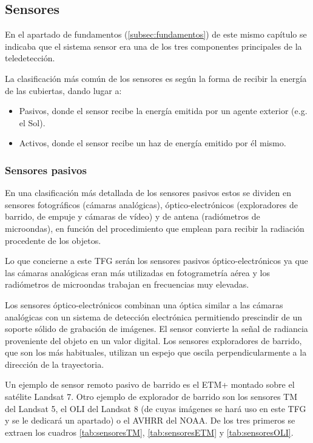 \subsection{Sensores}
\label{subsec:sensores}
En el apartado de fundamentos (\ref{subsec:fundamentos}) de este mismo capítulo se indicaba que el sistema sensor era una de los tres componentes principales de la teledetección.%

La clasificación más común de los sensores es según la forma de recibir la energía de las cubiertas, dando lugar a:
\begin{itemize}
	\item Pasivos, donde el sensor recibe la energía emitida por un agente exterior (e.g. el Sol).
	\item Activos, donde el sensor recibe un haz de energía emitido por él mismo.
\end{itemize}

\subsubsection{Sensores pasivos} \label{subsubsec:sensorespasivos}
En una clasificación más detallada de los sensores pasivos estos se dividen en sensores fotográficos (cámaras analógicas), óptico-electrónicos (exploradores de barrido, de empuje y cámaras de vídeo) y de antena (radiómetros de microondas), en función del procedimiento que emplean para recibir la radiación procedente de los objetos.%

Lo que concierne a este \ac{TFG} serán los sensores pasivos óptico-electrónicos ya que las cámaras analógicas eran más utilizadas en fotogrametría aérea y los radiómetros de microondas trabajan en frecuencias muy elevadas.%

Los sensores óptico-electrónicos combinan una óptica similar a las cámaras analógicas con un sistema de detección electrónica permitiendo prescindir de un soporte sólido de grabación de imágenes. El sensor convierte la señal de radiancia proveniente del objeto en un valor digital. Los sensores exploradores de barrido, que son los más habituales, utilizan un espejo que oscila perpendicularmente a la dirección de la trayectoria.%

Un ejemplo de sensor remoto pasivo de barrido es el \ac{ETM+} montado sobre el satélite Landsat 7. Otro ejemplo de explorador de barrido son los sensores \ac{TM} del Landsat 5, el \ac{OLI} del Landsat 8 (de cuyas imágenes se hará uso en este \ac{TFG} y se le dedicará un apartado) o el \ac{AVHRR} del NOAA. De los tres primeros se extraen los cuadros \ref{tab:sensoresTM}, \ref{tab:sensoresETM} y \ref{tab:sensoresOLI}.%

